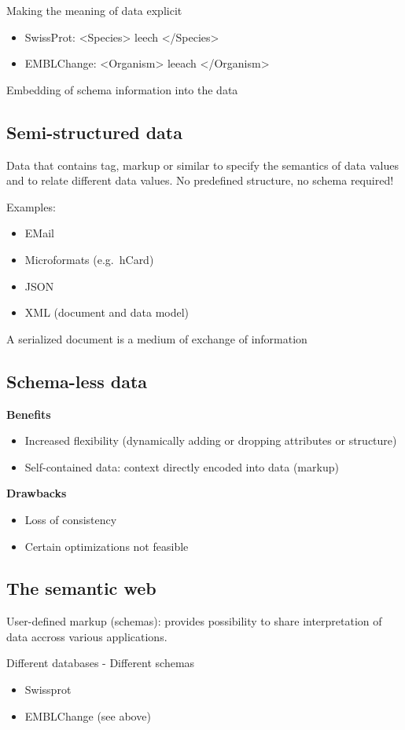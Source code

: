 Making the meaning of data explicit
\begin{itemize}
\item SwissProt: <Species> leech </Species>
\item EMBLChange: <Organism> leeach </Organism>
\end{itemize}

Embedding of schema information into the data

\subsection{Semi-structured data}
Data that contains tag, markup or similar to specify the semantics of
data values and to relate different data values. No predefined
structure, no schema required!

Examples:
\begin{itemize}
\item EMail
\item Microformats (e.g.\ hCard)
\item JSON
\item XML (document and data model)
\end{itemize}

A serialized document is a medium of exchange of information

\subsection{Schema-less data}
\textbf{Benefits}
\begin{itemize}
\item Increased flexibility (dynamically adding or dropping attributes
  or structure)
\item Self-contained data: context directly encoded into data (markup)
\end{itemize}
\textbf{Drawbacks}
\begin{itemize}
\item Loss of consistency
\item Certain optimizations not feasible
\end{itemize}

\subsection{The semantic web}
User-defined markup (schemas): provides possibility to share
interpretation of data accross various applications.

Different databases - Different schemas
\begin{itemize}
\item Swissprot
\item EMBLChange (see above)
\end{itemize}

